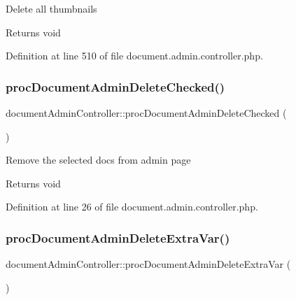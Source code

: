 Delete all thumbnails \begin{DoxyReturn}{Returns}
void 
\end{DoxyReturn}


Definition at line 510 of file document.\+admin.\+controller.\+php.

\mbox{\label{classdocumentAdminController_a98c455685a7e8e4ab6633a8a66e6f712}} 
\subsubsection{\texorpdfstring{proc\+Document\+Admin\+Delete\+Checked()}{procDocumentAdminDeleteChecked()}}
{\footnotesize\ttfamily document\+Admin\+Controller\+::proc\+Document\+Admin\+Delete\+Checked (\begin{DoxyParamCaption}{ }\end{DoxyParamCaption})}

Remove the selected docs from admin page \begin{DoxyReturn}{Returns}
void 
\end{DoxyReturn}


Definition at line 26 of file document.\+admin.\+controller.\+php.

\mbox{\label{classdocumentAdminController_a44eca9af136c50f1d6624a4de83b596a}} 
\subsubsection{\texorpdfstring{proc\+Document\+Admin\+Delete\+Extra\+Var()}{procDocumentAdminDeleteExtraVar()}}
{\footnotesize\ttfamily document\+Admin\+Controller\+::proc\+Document\+Admin\+Delete\+Extra\+Var (\begin{DoxyParamCaption}{ }\end{DoxyParamCaption})}

